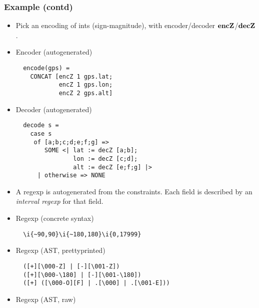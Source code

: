\documentclass{beamer}
\newcommand{\konst}[1]{\ensuremath{\mbox{\bf{#1}}}}
\begin{document}
\begin{frame}\frametitle{Example (contd)}

\begin{itemize}

\item Pick an encoding of ints (sign-magnitude), with encoder/decoder
  \konst{encZ}/\konst{decZ}. 

\item Encoder (autogenerated)

\begin{verbatim}
  encode(gps) = 
    CONCAT [encZ 1 gps.lat; 
            encZ 1 gps.lon; 
            encZ 2 gps.alt]
\end{verbatim}

\item Decoder (autogenerated)

\begin{verbatim}
  decode s =
    case s
     of [a;b;c;d;e;f;g] =>
        SOME <| lat := decZ [a;b];
                lon := decZ [c;d];
                alt := decZ [e;f;g] |>
      | otherwise => NONE
\end{verbatim}

\framebreak

\item A regexp is autogenerated from the constraints. Each field
  is described by an \emph{interval regexp} for that field.

\vspace*{5mm}

\item Regexp (concrete syntax)

\begin{verbatim}
  \i{~90,90}\i{~180,180}\i{0,17999}
\end{verbatim}

\vspace*{5mm}

\item Regexp (AST, prettyprinted)

\begin{verbatim}
  ([+][\000-Z] | [-][\001-Z])
  ([+][\000-\180] | [-][\001-\180])
  ([+] ([\000-O][F] | .[\000] | .[\001-E]))
\end{verbatim}

\framebreak

\item Regexp (AST, raw)


\end{itemize}
\end{frame}
\end{document}
